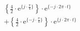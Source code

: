 \correct
\[
\begin{split}
&   \left \{ \frac{4}{2} \cdot \textrm{e}^{\{ j \cdot \frac{\pi}{4} \}} \right \} \cdot \textrm{e}^{\{- j \cdot 2\pi \cdot t \}}\\
&+  \left \{ \frac{4}{2} \cdot \textrm{e}^{\{ -j \cdot \frac{\pi}{4} \}} \right \} \cdot \textrm{e}^{\{ j \cdot 2\pi \cdot t \}}\\
\end{split}
\]
